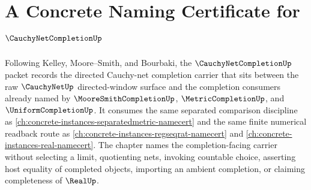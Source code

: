 \chapter{A Concrete Naming Certificate for $\CauchyNetCompletionUp$}
\label{ch:concrete-instances-cauchynetcompletion-namecert}

Following Kelley, Moore--Smith, and Bourbaki, the $\CauchyNetCompletionUp$ packet records the directed Cauchy-net completion carrier that sits between the raw $\CauchyNetUp$ directed-window surface and the completion consumers already named by $\MooreSmithCompletionUp$, $\MetricCompletionUp$, and $\UniformCompletionUp$. It consumes the same separated comparison discipline as \autoref{ch:concrete-instances-separatedmetric-namecert} and the same finite numerical readback route as \autoref{ch:concrete-instances-regseqrat-namecert} and \autoref{ch:concrete-instances-real-namecert}. The chapter names the completion-facing carrier without selecting a limit, quotienting nets, invoking countable choice, asserting host equality of completed objects, importing an ambient completion, or claiming completeness of $\RealUp$.

